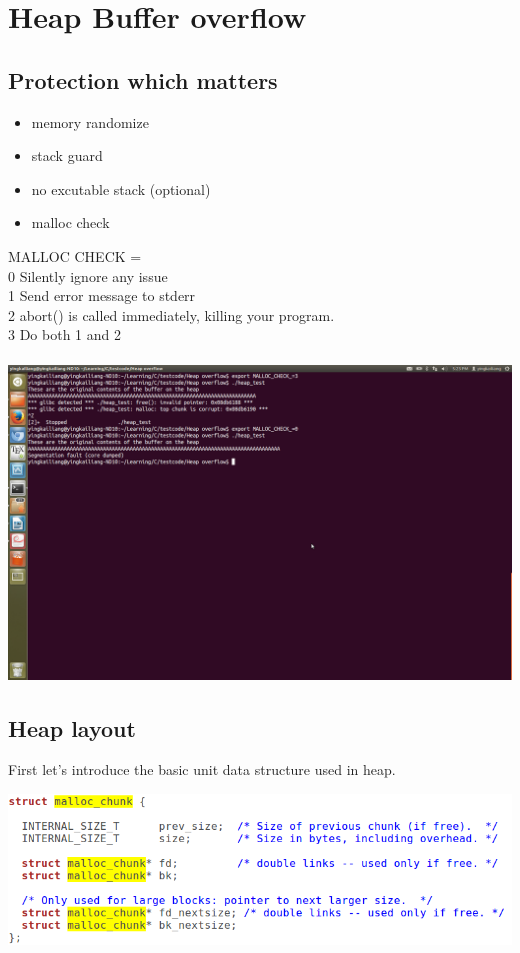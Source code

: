 \documentclass[12pt]{article}
\begin{document}
\section{Heap Buffer overflow}

\subsection{Protection which matters}
\begin{itemize}
\item memory randomize 
\item stack guard
\item no excutable stack (optional)
\item malloc check
\end{itemize}
MALLOC CHECK = \\
0 Silently ignore any issue \\
1 Send error message to stderr \\
2 abort() is called immediately, killing your program. \\
3 Do both 1 and 2\\\\ 
\includegraphics[scale=0.2]{Malloc_check.png} \\

\subsection{Heap layout}

First let's introduce the basic unit data structure used in heap. 

\includegraphics[scale=0.4]{malloc_chunk_code.png}
\end{document}
